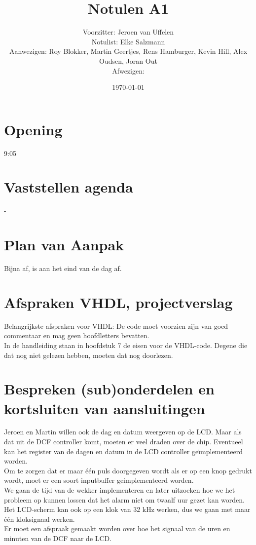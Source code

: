 \documentclass[11pt,twoside,a4paper]{article}
\title{Notulen A1}
\author{
Voorzitter: Jeroen van Uffelen\\
Notulist: Elke Salzmann\\
Aanwezigen: Roy Blokker, Martin Geertjes, Rens Hamburger, Kevin Hill, Alex Oudsen, Joran Out\\
Afwezigen: \\
}
\date{\today}
\begin{document}
\maketitle

\section{Opening}
9:05

\section{Vaststellen agenda}
-

\section{Plan van Aanpak}
Bijna af, is aan het eind van de dag af.

\section{Afspraken VHDL, projectverslag}
Belangrijkste afspraken voor VHDL: De code moet voorzien zijn van goed commentaar en mag geen hoofdletters bevatten.\\
In de handleiding staan in hoofdstuk 7 de eisen voor de VHDL-code. Degene die dat nog niet gelezen hebben, moeten dat nog doorlezen.

\section{Bespreken (sub)onderdelen en kortsluiten van aansluitingen}
Jeroen en Martin willen ook de dag en datum weergeven op de LCD. Maar als dat uit de DCF controller komt, moeten er veel draden over de chip. Eventueel kan het register van de dagen en datum in de LCD controller geïmplementeerd worden.\\
Om te zorgen dat er maar \'e\'en puls doorgegeven wordt als er op een knop gedrukt wordt, moet er een soort inputbuffer geimplementeerd worden.\\
We gaan de tijd van de wekker implementeren en later uitzoeken hoe we het probleem op kunnen lossen dat het alarm niet om twaalf uur gezet kan worden.\\
Het LCD-scherm kan ook op een klok van 32 kHz werken, dus we gaan met maar \'e\'en kloksignaal werken.\\
Er moet een afspraak gemaakt worden over hoe het signaal van de uren en minuten van de DCF naar de LCD.
\end{document}
